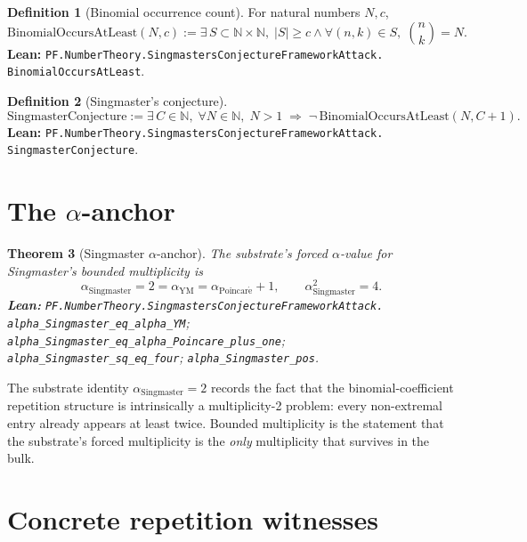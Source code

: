 \documentclass[11pt,a4paper]{article}
\theoremstyle{plain}
\newtheorem{theorem}{Theorem}[section]
\theoremstyle{definition}
\newtheorem{definition}[theorem]{Definition}
\begin{document}
\begin{definition}[Binomial occurrence count]
\label{def:occurs}
For natural numbers $N, c$,
\[
\mathrm{BinomialOccursAtLeast}(N, c) :=
\exists\, S \subset \mathbb{N} \times \mathbb{N},\;
|S| \ge c \wedge \forall (n, k) \in S,\;
\binom{n}{k} = N.
\]
\textbf{Lean:}
\texttt{PF.NumberTheory.SingmastersConjectureFrameworkAttack.\\
BinomialOccursAtLeast}.
\end{definition}

\begin{definition}[Singmaster's conjecture]
\label{def:singmaster}
\[
\mathrm{SingmasterConjecture} :=
\exists\, C \in \mathbb{N},\; \forall N \in \mathbb{N},\;
N > 1 \;\Rightarrow\; \neg\,\mathrm{BinomialOccursAtLeast}(N, C + 1).
\]
\textbf{Lean:}
\texttt{PF.NumberTheory.SingmastersConjectureFrameworkAttack.\\
SingmasterConjecture}.
\end{definition}

\section{The $\alpha$-anchor}

\begin{theorem}[Singmaster $\alpha$-anchor]
\label{thm:alpha-sing}
The substrate's forced $\alpha$-value for Singmaster's bounded
multiplicity is
\[
\alpha_{\mathrm{Singmaster}} = 2 = \alpha_{\mathrm{YM}}
  = \alpha_{\mathrm{Poincar\acute e}} + 1,
\qquad
\alpha_{\mathrm{Singmaster}}^{2} = 4.
\]
\textbf{Lean:}
\texttt{PF.NumberTheory.SingmastersConjectureFrameworkAttack.\\
alpha\_Singmaster\_eq\_alpha\_YM};
\texttt{alpha\_Singmaster\_eq\_alpha\_Poincare\_plus\_one};
\texttt{alpha\_Singmaster\_sq\_eq\_four};
\texttt{alpha\_Singmaster\_pos}.
\end{theorem}

The substrate identity $\alpha_{\mathrm{Singmaster}} = 2$ records
the fact that the binomial-coefficient repetition structure is
intrinsically a multiplicity-2 problem: every non-extremal entry
already appears at least twice. Bounded multiplicity is the
statement that the substrate's forced multiplicity is the
\emph{only} multiplicity that survives in the bulk.

\section{Concrete repetition witnesses}
\end{document}
